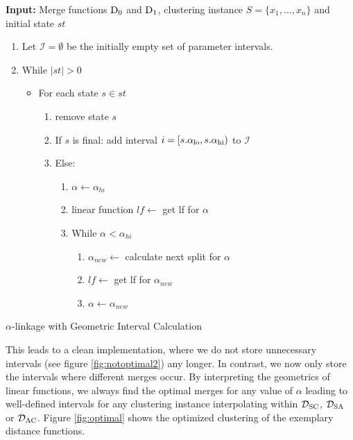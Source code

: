\begin{algorithm}
    \textbf{Input:} Merge functions $\operatorname{D_{0}}$ and $\operatorname{D_{1}}$, clustering instance $S = \{x_1, \dots, x_n\}$ and initial state $st$
    \begin{enumerate}[nosep, leftmargin=*]
    \item Let $\mathcal{I} = \emptyset$ be the initially empty set of parameter intervals.
    \item While $|st| > 0$
    \begin{itemize}[nosep, leftmargin=*]
        \item For each state $s \in st$
        \begin{enumerate}
            \item remove state $s$\;
            \item If $s$ is final: add interval $i = [s.\alpha_\text{lo}, s.\alpha_\text{hi})$ to $\mathcal{I}$
            \item Else: 
            \begin{enumerate}
                \item $\alpha \gets \alpha_{lo}$\;
                \item linear function $lf \gets$ get lf for $\alpha$
                \item While $\alpha < \alpha_{hi}$
                \begin{enumerate}
                    \item $\alpha_{new} \gets$ calculate next split for $\alpha$
                    \item $lf \gets$ get lf for $\alpha_{new}$\;
                    \item $\alpha \gets \alpha_{new}$
                \end{enumerate}
            \end{enumerate}
        \end{enumerate}
    \end{itemize}
    \end{enumerate}
    \caption{$\alpha$-linkage with Geometric Interval Calculation}
    \label{alg:alphalinkage4}
\end{algorithm}

This leads to a clean implementation, where we do not store unnecessary intervals (see figure \ref{fig:notoptimal2}) any longer. In contrast, we now only store the intervals where different merges occur. By interpreting the geometrics of linear functions, we always find the optimal merges for any value of $\alpha$ leading to well-defined intervals for any clustering instance interpolating within $\mathcal{D}_\text{SC}$, $\mathcal{D}_\text{SA}$ or $\mathcal{D}_\text{AC}$. Figure \ref{fig:optimal} shows the optimized clustering of the exemplary distance functions.


